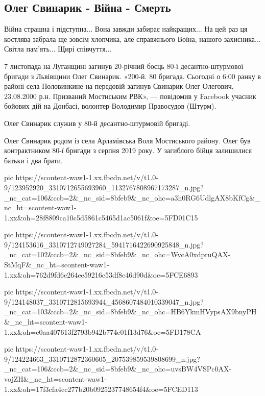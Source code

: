  
 
 

\subsection{Олег Свинарик - Війна - Смерть}
\label{sec:07_11_2020.fb.natalia_lisjuk.1.oleg_svynaryk_death}

Війна страшна і підступна... Вона завжди забирає найкращих... На цей раз ця
костлява забрала  ще зовсім хлопчика, але справжнього Воїна, нашого
захисника... Світла пам'ять... Щирі співчуття...

7 листопада на Луганщині загинув 20-річний боєць 80-ї десантно-штурмової
бригади з Львівщини Олег Свинарик.  «200-й. 80 бригада. Сьогодні о 6:00 ранку
в районі села Половинкине на передовій загинув Свинарик Олег Олегович,
23.08.2000 р.н. Призваний Мостиським РВК», --- повідомив у Facebook учасник
бойових дій на Донбасі, волонтер Володимир Правосудов (Штурм).

Олег Свинарик служив у 80-й десантно-штурмовій бригаді.

Олег Свинарик родом із села Арламівська Воля Мостиського району.  Олег  був
контрактником 80-ї бригади з серпня 2019 року. У загиблого бійця залишилися
батьки і два брати.

\ifcmt
pic https://scontent-waw1-1.xx.fbcdn.net/v/t1.0-9/123952920_3310712655693960_1132767808967173287_n.jpg?_nc_cat=106&ccb=2&_nc_sid=8bfeb9&_nc_ohc=a3h0RG6UdlgAX8bKfCg&_nc_ht=scontent-waw1-1.xx&oh=28f8809ca10c5d5861c5465d1ac5061f&oe=5FD01C15

pic https://scontent-waw1-1.xx.fbcdn.net/v/t1.0-9/124153616_3310712749027284_5941716422690925848_n.jpg?_nc_cat=102&ccb=2&_nc_sid=8bfeb9&_nc_ohc=WvcA0xdpruQAX-StMqF&_nc_ht=scontent-waw1-1.xx&oh=762d9fd6e264ee59216c53df8c46d90d&oe=5FCE6893

pic https://scontent-waw1-1.xx.fbcdn.net/v/t1.0-9/124148037_3310712815693944_4568607484010339047_n.jpg?_nc_cat=103&ccb=2&_nc_sid=8bfeb9&_nc_ohc=HB6YkmHVypsAX9bnyPH&_nc_ht=scontent-waw1-1.xx&oh=c0aa407613f2793b942b774e01f13d76&oe=5FD178CA

pic https://scontent-waw1-1.xx.fbcdn.net/v/t1.0-9/124224663_3310712872360605_207539859539808699_n.jpg?_nc_cat=106&ccb=2&_nc_sid=8bfeb9&_nc_ohc=uvsBW4VSPc0AX-vojZH&_nc_ht=scontent-waw1-1.xx&oh=17f3cfa4cc277b20b0925237748654f4&oe=5FCED113
\fi
